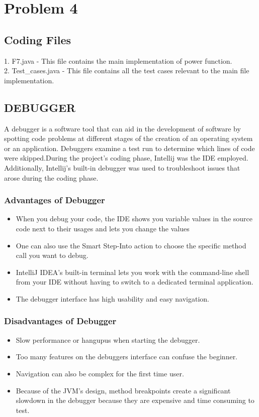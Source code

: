 \documentclass[a4paper,12pt]{article}
\begin{document}
\newpage

\section{\huge\centering Problem 4}
\subsection{\large Coding Files}
\item 1. F7.java - This file contains the main implementation of power function.\\
2. Test\_cases.java - This file contains all the test cases relevant to the main file implementation.
\subsection{\large DEBUGGER}
\item A debugger is a software tool that can aid in the development of software by spotting code problems at different stages of the creation of an operating system or an application. Debuggers examine a test run to determine which lines of code were skipped.During the project's coding phase, Intellij was the IDE employed. Additionally, Intellij's built-in debugger was used to troubleshoot issues that arose during the coding phase.

\subsubsection{Advantages of Debugger}
\begin{itemize}
\item When you debug your code, the IDE shows you variable values in the source code next to their usages and lets you change the values
\item One can also use the Smart Step-Into action to choose the specific method call you want to debug.
\item IntelliJ IDEA’s built-in terminal lets you work with the command-line shell from your IDE without having to switch to a dedicated terminal application.
\item The debugger interface has high usability and easy navigation.
\end{itemize}


\subsubsection{Disadvantages of Debugger}
\begin{itemize}

\item Slow performance or hangupus when starting the debugger.
\item Too many features on the debuggers interface can confuse the beginner.
\item Navigation can also be complex for the first time user.
\item Because of the JVM's design, method breakpoints create a significant slowdown in the debugger because they are expensive and time consuming to test.

\end{itemize}
\end{document}
